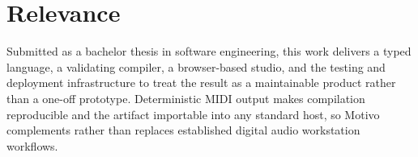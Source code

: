 \section{Relevance}\label{sec:relevance}

Submitted as a bachelor thesis in software engineering, this work delivers a typed language, a validating
compiler, a browser-based studio, and the testing and deployment infrastructure to treat the result as a
maintainable product rather than a one-off prototype.
Deterministic MIDI output makes compilation reproducible and
the artifact importable into any standard host, so Motivo complements rather than replaces established
digital audio workstation workflows.
